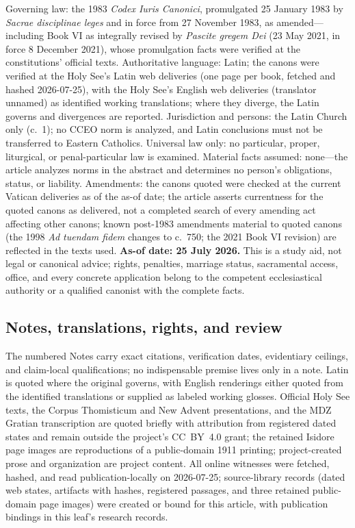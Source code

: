 Governing law: the 1983 \emph{Codex Iuris Canonici}, promulgated 25 January 1983 by \emph{Sacrae disciplinae leges} and in force from 27 November 1983, as amended---including Book VI as integrally revised by \emph{Pascite gregem Dei} (23 May 2021, in force 8 December 2021), whose promulgation facts were verified at the constitutions' official texts. Authoritative language: Latin; the canons were verified at the Holy See's Latin web deliveries (one page per book, fetched and hashed 2026-07-25), with the Holy See's English web deliveries (translator unnamed) as identified working translations; where they diverge, the Latin governs and divergences are reported. Jurisdiction and persons: the Latin Church only (c.~1); no CCEO norm is analyzed, and Latin conclusions must not be transferred to Eastern Catholics. Universal law only: no particular, proper, liturgical, or penal-particular law is examined. Material facts assumed: none---the article analyzes norms in the abstract and determines no person's obligations, status, or liability. Amendments: the canons quoted were checked at the current Vatican deliveries as of the as-of date; the article asserts currentness for the quoted canons as delivered, not a completed search of every amending act affecting other canons; known post-1983 amendments material to quoted canons (the 1998 \emph{Ad tuendam fidem} changes to c.~750; the 2021 Book VI revision) are reflected in the texts used. \textbf{As-of date: 25 July 2026.} This is a study aid, not legal or canonical advice; rights, penalties, marriage status, sacramental access, office, and every concrete application belong to the competent ecclesiastical authority or a qualified canonist with the complete facts.

\subsection{Notes, translations, rights, and review}

The numbered Notes carry exact citations, verification dates, evidentiary ceilings, and claim-local qualifications; no indispensable premise lives only in a note. Latin is quoted where the original governs, with English renderings either quoted from the identified translations or supplied as labeled working glosses. Official Holy See texts, the Corpus Thomisticum and New Advent presentations, and the MDZ Gratian transcription are quoted briefly with attribution from registered dated states and remain outside the project's CC~BY~4.0 grant; the retained Isidore page images are reproductions of a public-domain 1911 printing; project-created prose and organization are project content. All online witnesses were fetched, hashed, and read publication-locally on 2026-07-25; source-library records (dated web states, artifacts with hashes, registered passages, and three retained public-domain page images) were created or bound for this article, with publication bindings in this leaf's research records.

